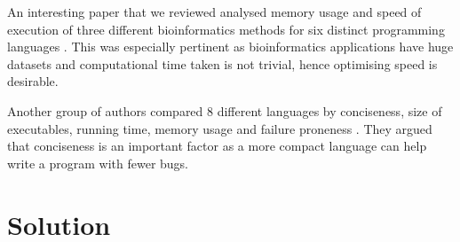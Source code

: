 An interesting paper that we reviewed analysed memory usage and speed of execution of three different bioinformatics methods for six distinct programming languages \cite{Fourment2008}. This was especially pertinent as bioinformatics applications have huge datasets and computational time taken is not trivial, hence optimising speed is desirable.\par

Another group of authors compared 8 different languages by conciseness, size of executables, running time, memory usage and failure proneness \cite{Nanz2015}. They argued that conciseness is an important factor as a more compact language can help write a program with fewer bugs.


\section{Solution}




